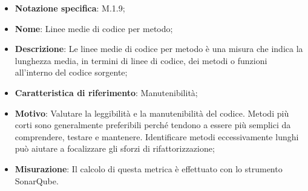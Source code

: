 \begin{itemize}
    \item \textbf{Notazione specifica}: M.1.9;
    \item \textbf{Nome}: Linee medie di codice per metodo;
    \item \textbf{Descrizione}: Le linee medie di codice per metodo è una misura che indica la lunghezza media, in termini di linee di codice, dei metodi o funzioni all'interno del codice sorgente;
    \item \textbf{Caratteristica di riferimento}: Manutenibilità;
    \item \textbf{Motivo}: Valutare la leggibilità e la manutenibilità del codice. Metodi più corti sono generalmente preferibili perché tendono a essere più semplici da comprendere, testare e mantenere. Identificare metodi eccessivamente lunghi può aiutare a focalizzare gli sforzi di rifattorizzazione;
    \item \textbf{Misurazione}: Il calcolo di questa metrica è effettuato con lo strumento SonarQube.
\end{itemize}
